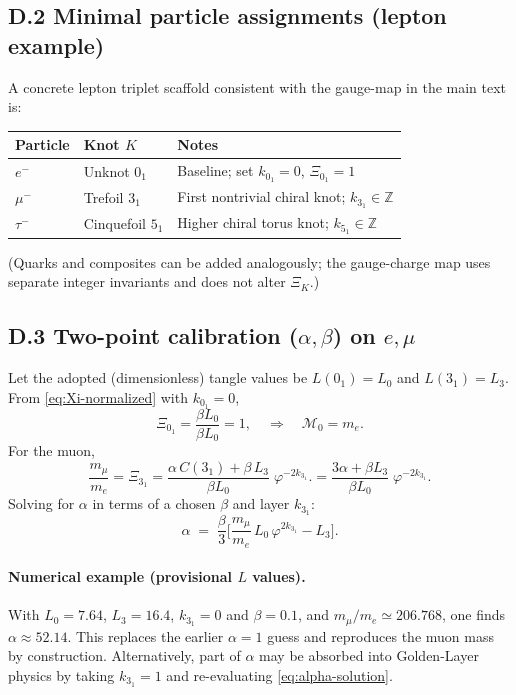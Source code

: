\documentclass[11pt, preprint,titlepage]{revtex4-2}
\begin{document}
		\subsection*{D.2 Minimal particle assignments (lepton example)}
		A concrete lepton triplet scaffold consistent with the gauge-map in the main text is:
		\begin{center}
		\begin{tabular}{lll}
		\toprule
		Particle & Knot \(K\) & Notes \\
		\midrule
		\(e^-\)  & Unknot \(0_1\) & Baseline; set \(k_{0_1}=0\), \(\Xi_{0_1}=1\) \\
		\(\mu^-\) & Trefoil \(3_1\) & First nontrivial chiral knot; \(k_{3_1}\in\mathbb{Z}\) \\
		\(\tau^-\) & Cinquefoil \(5_1\) & Higher chiral torus knot; \(k_{5_1}\in\mathbb{Z}\) \\
		\bottomrule
		\end{tabular}
		\end{center}
		(Quarks and composites can be added analogously; the gauge-charge map uses separate integer invariants and does not alter \(\Xi_K\).)

		\subsection*{D.3 Two-point calibration (\texorpdfstring{\(\alpha,\beta\)}{alpha,beta}) on \texorpdfstring{\(e,\mu\)}{e,mu}}
		Let the adopted (dimensionless) tangle values be
		\(L(0_1)=L_0\) and \(L(3_1)=L_3\).
		From \eqref{eq:Xi-normalized} with \(k_{0_1}=0\),
		\[
		\Xi_{0_1}=\frac{\beta L_0}{\beta L_0}=1,
		\quad\Rightarrow\quad \mathcal{M}_0=m_e.
		\]
		For the muon,
		\[
		\frac{m_\mu}{m_e}
		= \Xi_{3_1}
        = \frac{\alpha\,C(3_1)+\beta\,L_3}{\beta L_0}\;\varphi^{-2k_{3_1}}.
		= \frac{3\alpha+\beta L_3}{\beta L_0}\;\varphi^{-2k_{3_1}}.
		\]
		Solving for \(\alpha\) in terms of a chosen \(\beta\) and layer \(k_{3_1}\):
		\begin{equation}
		\alpha
		\;=\; \frac{\beta}{3}\Bigg[\frac{m_\mu}{m_e}\,L_0\,\varphi^{2k_{3_1}} - L_3\Bigg].
		\label{eq:alpha-solution}
		\end{equation}

		\paragraph{Numerical example (provisional \(L\) values).}
		With \(L_0=7.64\), \(L_3=16.4\), \(k_{3_1}=0\) and \(\beta=0.1\),
		and \(m_\mu/m_e\simeq 206.768\),
		one finds \(\alpha \approx 52.14\).
		This replaces the earlier \(\alpha=1\) guess and reproduces the muon mass by construction.
		Alternatively, part of \(\alpha\) may be absorbed into Golden-Layer physics by taking \(k_{3_1}=1\) and re-evaluating \eqref{eq:alpha-solution}.
\end{document}
